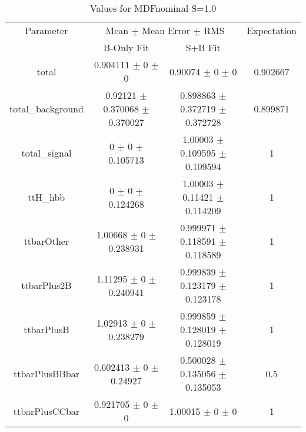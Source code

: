 \begin{table}
\centering
\caption{Values for MDFnominal S=1.0}
\begin{tabular}{cccc}
\toprule
Parameter & \multicolumn{2}{c}{Mean $\pm$ Mean Error $\pm$ RMS} & Expectation\\
 & B-Only Fit & S+B Fit & \\
\midrule
total & \num{0.904111} $\pm$ \num{0} $\pm$ \num{0} & \num{0.90074} $\pm$ \num{0} $\pm$ \num{0} & \num{0.902667}\\
total\_background & \num{0.92121} $\pm$ \num{0.370068} $\pm$ \num{0.370027} & \num{0.898863} $\pm$ \num{0.372719} $\pm$ \num{0.372728} & \num{0.899871}\\
total\_signal & \num{0} $\pm$ \num{0} $\pm$ \num{0.105713} & \num{1.00003} $\pm$ \num{0.109595} $\pm$ \num{0.109594} & \num{1}\\
ttH\_hbb & \num{0} $\pm$ \num{0} $\pm$ \num{0.124268} & \num{1.00003} $\pm$ \num{0.11421} $\pm$ \num{0.114209} & \num{1}\\
ttbarOther & \num{1.00668} $\pm$ \num{0} $\pm$ \num{0.238931} & \num{0.999971} $\pm$ \num{0.118591} $\pm$ \num{0.118589} & \num{1}\\
ttbarPlus2B & \num{1.11295} $\pm$ \num{0} $\pm$ \num{0.240941} & \num{0.999839} $\pm$ \num{0.123179} $\pm$ \num{0.123178} & \num{1}\\
ttbarPlusB & \num{1.02913} $\pm$ \num{0} $\pm$ \num{0.238279} & \num{0.999859} $\pm$ \num{0.128019} $\pm$ \num{0.128019} & \num{1}\\
ttbarPlusBBbar & \num{0.602413} $\pm$ \num{0} $\pm$ \num{0.24927} & \num{0.500028} $\pm$ \num{0.135056} $\pm$ \num{0.135053} & \num{0.5}\\
ttbarPlusCCbar & \num{0.921705} $\pm$ \num{0} $\pm$ \num{0} & \num{1.00015} $\pm$ \num{0} $\pm$ \num{0} & \num{1}\\
\bottomrule
\end{tabular}
\end{table}
